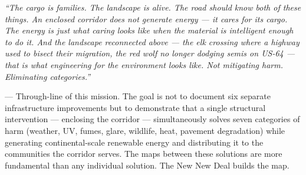 \documentclass[11pt,letterpaper]{article}
\begin{document}
\begin{quotebox}
\textit{``The cargo is families. The landscape is alive. The road should know both of these things. An enclosed corridor does not generate energy --- it cares for its cargo. The energy is just what caring looks like when the material is intelligent enough to do it. And the landscape reconnected above --- the elk crossing where a highway used to bisect their migration, the red wolf no longer dodging semis on US-64 --- that is what engineering for the environment looks like. Not mitigating harm. Eliminating categories.''}

\vspace{0.8em}
\noindent --- Through-line of this mission. The goal is not to document six separate infrastructure improvements but to demonstrate that a single structural intervention --- enclosing the corridor --- simultaneously solves seven categories of harm (weather, UV, fumes, glare, wildlife, heat, pavement degradation) while generating continental-scale renewable energy and distributing it to the communities the corridor serves. The maps between these solutions are more fundamental than any individual solution. The New New Deal builds the map.
\end{quotebox}
\end{document}
